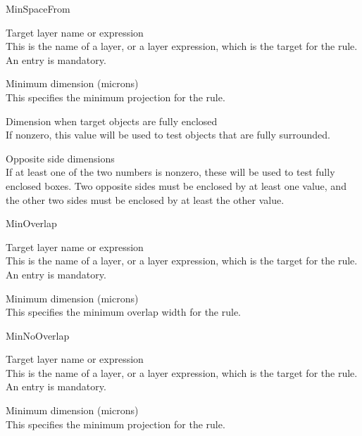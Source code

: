 \begin{description}
\item{\vt MinSpaceFrom}\\
\begin{description}
\item{\cb Target layer name or expression}\\
This is the name of a layer, or a layer expression, which is the
target for the rule.  An entry is mandatory.

\item{\cb Minimum dimension (microns)}\\
This specifies the minimum projection for the rule.

\item{\cb Dimension when target objects are fully enclosed}\\
If nonzero, this value will be used to test objects that
are fully surrounded.

\item{\cb Opposite side dimensions}\\
If at least one of the two numbers is nonzero, these will be used to
test fully enclosed boxes.  Two opposite sides must be enclosed by at
least one value, and the other two sides must be enclosed by at least
the other value.
\end{description}

\item{\vt MinOverlap}\\
\begin{description}
\item{\cb Target layer name or expression}\\
This is the name of a layer, or a layer expression, which is the
target for the rule.  An entry is mandatory.

\item{\cb Minimum dimension (microns)}\\
This specifies the minimum overlap width for the rule.
\end{description}

\item{\vt MinNoOverlap}\\
\begin{description}
\item{\cb Target layer name or expression}\\
This is the name of a layer, or a layer expression, which is the
target for the rule.  An entry is mandatory.

\item{\cb Minimum dimension (microns)}\\
This specifies the minimum projection for the rule.
\end{description}

\end{description}


